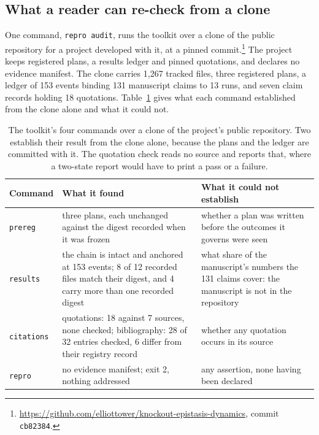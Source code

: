 \documentclass{article}
\newcommand{\code}[1]{\texttt{#1}}
\newcommand{\tPlan}{\code{prereg}}
\newcommand{\tRun}{\code{results}}
\newcommand{\tCite}{\code{citations}}
\newcommand{\tVerify}{\code{repro}}
\begin{document}
\subsection{What a reader can re-check from a clone}
\label{sec:comparative}

One command, \code{repro audit}, runs the toolkit over a clone of the public repository for a
project developed with it, at a pinned commit.\footnote{\url{https://github.com/elliottower/knockout-epistasis-dynamics},
commit \code{cb82384}.} The project keeps registered plans, a results ledger and pinned quotations,
and declares no evidence manifest. The clone carries 1{,}267 tracked files, three registered
plans, a ledger of 153 events binding 131 manuscript claims to 13 runs, and seven claim records
holding 18 quotations. Table~\ref{tab:audit} gives what each command established from the clone
alone and what it could not.

\begin{table}[h]
\centering
\small
\caption{The toolkit's four commands over a clone of the project's public repository. Two establish their result
from the clone alone, because the plans and the ledger are committed with it. The quotation check
reads no source and reports that, where a two-state report would have to print a pass or a
failure.}
\label{tab:audit}
\begin{tabular}{@{}>{\raggedright\arraybackslash}p{}>{\raggedright\arraybackslash}p{}>{\raggedright\arraybackslash}p{}@{}}
\toprule
\textbf{Command} & \textbf{What it found} & \textbf{What it could not establish} \\
\midrule
\tPlan{} & three plans, each unchanged against the digest recorded when it was frozen & whether a plan was written before the outcomes it governs were seen \\
\tRun{} & the chain is intact and anchored at 153 events; 8 of 12 recorded files match their digest, and 4 carry more than one recorded digest & what share of the manuscript's numbers the 131 claims cover: the manuscript is not in the repository \\
\tCite{} & quotations: 18 against 7 sources, none checked; bibliography: 28 of 32 entries checked, 6 differ from their registry record & whether any quotation occurs in its source \\
\tVerify{} & no evidence manifest; exit 2, nothing addressed & any assertion, none having been declared \\
\bottomrule
\end{tabular}
\end{table}
\end{document}
